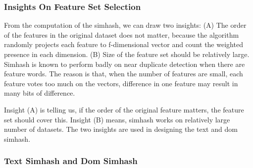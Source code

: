 \subsubsection{Insights On Feature Set Selection}
From the computation of the simhash, we can draw two insights:
(A) The order of the features in the original dataset does not matter, because
the algorithm randomly projects each feature to f-dimensional vector and count
the weighted presence in each dimension.
(B) Size of the feature set should be relatively large. Simhash is known to
perform badly on near duplicate detection when there are feature words. The
reason is that, when the number of features are small, each feature votes too
much on the vectors, difference in one feature may result in many bits of
difference.

Insight (A) is telling us, if the order of the original feature matters, the feature
set should cover this. Insight (B) means, simhash works on relatively large
number of datasets. The two insights are used in designing the text and dom
simhash.

\subsubsection{Text Simhash and Dom Simhash}


%
%
%
%
%
%
%



